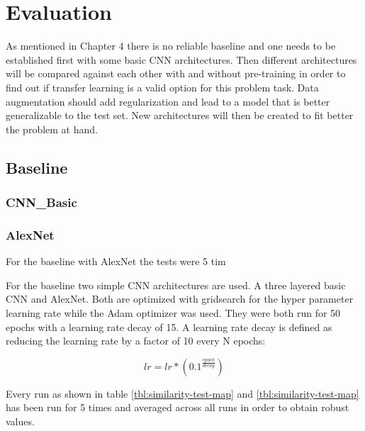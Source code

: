 \chapter{Evaluation}

As mentioned in Chapter 4 there is no reliable baseline and one needs to be established first with some basic CNN architectures. Then different architectures will be compared against each other with and without pre-training in order to find out if transfer learning is a valid option for this problem task. Data augmentation should add regularization and lead to a model that is better generalizable to the test set. New architectures will then be created to fit better the problem at hand.

\section{Baseline}

\subsection{CNN\_Basic}

\subsection{AlexNet}

For the baseline with AlexNet the tests were 5 tim

For the baseline two simple CNN architectures are used. A three layered basic CNN and AlexNet. Both are optimized with gridsearch for the hyper parameter learning rate while the Adam optimizer was used. They were both run for 50 epochs with a learning rate decay of 15. A learning rate decay is defined as reducing the learning rate by a factor of 10 every N epochs:

\[ lr = lr * (0.1^{\frac{epoch}{decay}}) \]


Every run as shown in table \ref{tbl:similarity-test-map} and \ref{tbl:similarity-test-map} has been run for 5 times and averaged across all runs in order to obtain robust values.


